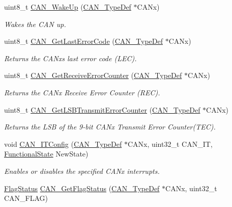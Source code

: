 \begin{DoxyCompactItemize}
uint8\+\_\+t \hyperlink{group___c_a_n___private___functions_ga78cdfbf1884b9e33c552bcbca15bed10}{C\+A\+N\+\_\+\+Wake\+Up} (\hyperlink{struct_c_a_n___type_def}{C\+A\+N\+\_\+\+Type\+Def} $\ast$C\+A\+Nx)
\begin{DoxyCompactList}\small\item\em Wakes the C\+AN up. \end{DoxyCompactList}\item 
uint8\+\_\+t \hyperlink{group___c_a_n___private___functions_gaaee721a392b6b21bfd15dc160aeb6924}{C\+A\+N\+\_\+\+Get\+Last\+Error\+Code} (\hyperlink{struct_c_a_n___type_def}{C\+A\+N\+\_\+\+Type\+Def} $\ast$C\+A\+Nx)
\begin{DoxyCompactList}\small\item\em Returns the C\+A\+Nx\textquotesingle{}s last error code (L\+EC). \end{DoxyCompactList}\item 
uint8\+\_\+t \hyperlink{group___c_a_n___private___functions_ga6903eecbec40eb1361d915ddde9a3274}{C\+A\+N\+\_\+\+Get\+Receive\+Error\+Counter} (\hyperlink{struct_c_a_n___type_def}{C\+A\+N\+\_\+\+Type\+Def} $\ast$C\+A\+Nx)
\begin{DoxyCompactList}\small\item\em Returns the C\+A\+Nx Receive Error Counter (R\+EC). \end{DoxyCompactList}\item 
uint8\+\_\+t \hyperlink{group___c_a_n___private___functions_ga85ee0c35bf7ca15d4e4c862eef534843}{C\+A\+N\+\_\+\+Get\+L\+S\+B\+Transmit\+Error\+Counter} (\hyperlink{struct_c_a_n___type_def}{C\+A\+N\+\_\+\+Type\+Def} $\ast$C\+A\+Nx)
\begin{DoxyCompactList}\small\item\em Returns the L\+SB of the 9-\/bit C\+A\+Nx Transmit Error Counter(\+T\+E\+C). \end{DoxyCompactList}\item 
void \hyperlink{group___c_a_n___private___functions_gad1a8b2499a780b5bfa4accb3597b02f4}{C\+A\+N\+\_\+\+I\+T\+Config} (\hyperlink{struct_c_a_n___type_def}{C\+A\+N\+\_\+\+Type\+Def} $\ast$C\+A\+Nx, uint32\+\_\+t C\+A\+N\+\_\+\+IT, \hyperlink{group___exported__types_gac9a7e9a35d2513ec15c3b537aaa4fba1}{Functional\+State} New\+State)
\begin{DoxyCompactList}\small\item\em Enables or disables the specified C\+A\+Nx interrupts. \end{DoxyCompactList}\item 
\hyperlink{group___exported__types_ga89136caac2e14c55151f527ac02daaff}{Flag\+Status} \hyperlink{group___c_a_n___private___functions_ga2faad96caf823ef463cc5b5b25c480bb}{C\+A\+N\+\_\+\+Get\+Flag\+Status} (\hyperlink{struct_c_a_n___type_def}{C\+A\+N\+\_\+\+Type\+Def} $\ast$C\+A\+Nx, uint32\+\_\+t C\+A\+N\+\_\+\+F\+L\+AG)

\end{DoxyCompactItemize}
